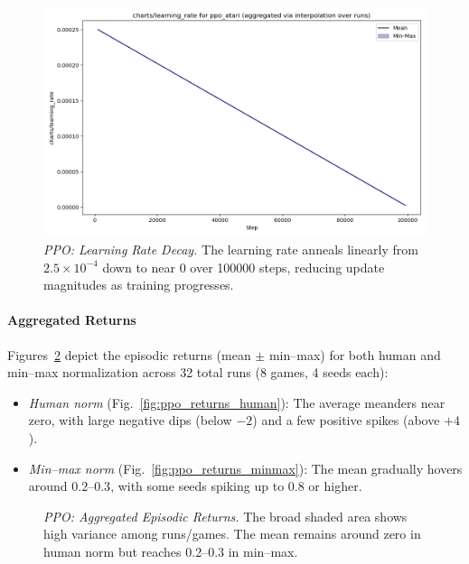 \begin{figure} 
	\centering
	\includegraphics[width=.5\textwidth]{figures/ppo/charts_learning_rate_ppo_atari.png}
	\caption{\emph{PPO: Learning Rate Decay.}
		The learning rate anneals linearly from $2.5\times10^{-4}$ down to near $0$ 
		over \num{100000} steps, reducing update magnitudes as training progresses.}
	\label{fig:ppo_lr}
\end{figure}

\paragraph{Aggregated Returns}
Figures~\ref{fig:ppo_returns_agg} depict the episodic returns (mean $\pm$ min--max) 
for both human and min--max normalization across 32 total runs (8 games, 4 seeds each):
\begin{itemize}
	\item \emph{Human norm} 
	(Fig.~\ref{fig:ppo_returns_human}): The average meanders near zero, with large 
	negative dips (below $-2$) and a few positive spikes (above $+4$).
	\item \emph{Min--max norm}
	(Fig.~\ref{fig:ppo_returns_minmax}): The mean gradually hovers around $0.2$--$0.3$, 
	with some seeds spiking up to $0.8$ or higher.
\end{itemize}

\begin{figure}
	\centering
	\quad
	\caption{\emph{PPO: Aggregated Episodic Returns.} 
		The broad shaded area shows high variance among runs/games. 
		The mean remains around zero in human norm but reaches 0.2--0.3 in min--max.}
	\label{fig:ppo_returns_agg}
\end{figure}

